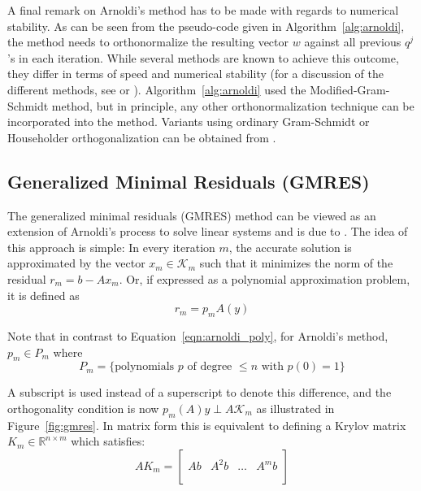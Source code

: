 \noindent A final remark on Arnoldi's method has to be made with regards to numerical stability. As can be seen from the pseudo-code given in Algorithm~\hyperref[alg:arnoldi]{\ref{alg:arnoldi}}, the method needs to orthonormalize the resulting vector $w$ against all previous $q^j$'s in each iteration. While several methods are known to achieve this outcome, they differ in terms of speed and numerical stability (for a discussion of the different methods, see \cite{golub_matrix_2013} or \cite{trefethen_numerical_1997}). Algorithm~\hyperref[alg:arnoldi]{\ref{alg:arnoldi}} used the Modified-Gram-Schmidt method, but in principle, any other orthonormalization technique can be incorporated into the method. Variants using ordinary Gram-Schmidt or Householder orthogonalization can be obtained from \cite{saad_iterative_2003}.



\subsection{Generalized Minimal Residuals (GMRES)}
\label{sec:gmres}

The generalized minimal residuals (GMRES) method can be viewed as an extension of Arnoldi's process to solve linear systems and is due to \cite{saad_gmres_1986}. The idea of this approach is simple: In every iteration $m$, the accurate solution is approximated by the vector $x_m \in \mathcal{K}_m$ such that it minimizes the norm of the residual $r_m=b-Ax_m$. Or, if expressed as a polynomial approximation problem, it is defined as
\begin{equation}
    r_m=p_mA(y)
\end{equation}

\noindent Note that in contrast to Equation~\hyperref[eqn:arnoldi_poly]{\ref{eqn:arnoldi_poly}}, for Arnoldi's method, $p_m \in P_m$ where
\begin{equation}
    P_m = \{\text{polynomials } p \text{ of degree } \leq n \text{ with }p(0)=1\}
\end{equation}

\noindent A subscript is used instead of a superscript to denote this difference, and the orthogonality condition is now $p_m(A)y \perp A\mathcal{K}_m$ as illustrated in Figure~\hyperref[fig:gmres]{\ref{fig:gmres}}. In matrix form this is equivalent to defining a Krylov matrix $K_m \in \mathbb{R}^{n \times m}$ which satisfies:
\begin{equation}
\label{eqn:krylov_matrix}
  AK_m =
  \left[
    \begin{array}{c|c|c|c}
      & & & \\
      Ab & A^2b & \dots & A^mb \\
      & & & \\
    \end{array}
  \right] 
\end{equation}


